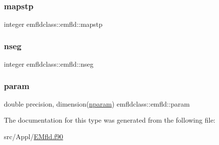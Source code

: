 \mbox{\label{structemfldclass_1_1emfld_ac18dfbe320fc1dc13393780eb0ae2613}} 
\subsubsection{\texorpdfstring{mapstp}{mapstp}}
{\footnotesize\ttfamily integer emfldclass\+::emfld\+::mapstp}

\mbox{\label{structemfldclass_1_1emfld_a35f0c51ff70d545cef92bbbfa9546006}} 
\subsubsection{\texorpdfstring{nseg}{nseg}}
{\footnotesize\ttfamily integer emfldclass\+::emfld\+::nseg}

\mbox{\label{structemfldclass_1_1emfld_ac4480d690e4e4d88d88ba939af8213cd}} 
\subsubsection{\texorpdfstring{param}{param}}
{\footnotesize\ttfamily double precision, dimension(\mbox{\hyperlink{namespaceemfldclass_ad6fed90f4153b92a9a9ff35a6ef146c3}{nparam}}) emfldclass\+::emfld\+::param}



The documentation for this type was generated from the following file\+:\begin{DoxyCompactItemize}
\item 
src/\+Appl/\mbox{\hyperlink{_e_mfld_8f90}{E\+Mfld.\+f90}}\end{DoxyCompactItemize}
